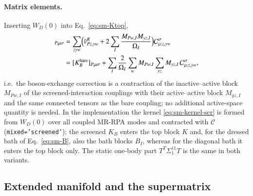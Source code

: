 \documentclass[aip,jcp,reprint,noshowkeys,superscriptaddress]{revtex4-1}
\begin{document}
\paragraph{Matrix elements.}
Inserting $W_D(0)$ into Eq.~\eqref{eq:sm-Ktop},
\begin{align}
  [K^{\rm scr}_B]_{P,\mu\sigma}
  &=\sum_{zyw}\Bigl(\bar v^R_{Pz,yw}+2\sum_I\frac{M_{Pw,I}M_{yz,I}}{\Omega_I}\Bigr)\mathcal C^{\sigma}_{\mu;z,yw}
  \nonumber\\
  &=[K^{\rm bare}_B]_{P,\mu\sigma}
  +\sum_I\frac{2}{\Omega_I}\sum_{w}M_{Pw,I}\sum_{yz}M_{yz,I}\,\mathcal C^{\sigma}_{\mu;z,yw},
  \label{eq:sm-KB-scr}
\end{align}
i.e.\ the boson-exchange correction is a contraction of the inactive--active
block $M_{Pw,I}$ of the screened-interaction couplings with their
active--active block $M_{yz,I}$ and the same connected tensors as the bare
coupling; no additional active-space quantity is needed.  In the
implementation the kernel \eqref{eq:sm-kernel-scr} is formed from $W_D(0)$
over all coupled MR-RPA modes and contracted with $\mathcal C$
(\texttt{mixed='screened'}); the screened $K_B$ enters the top block $K$
and, for the dressed bath of Eq.~\eqref{eq:sm-B}, also the bath blocks
$B_I$, whereas for the diagonal bath it enters the top block only.  The
static one-body part $T^{T}\Sigma^{11}_1T$ is the same in both variants.

\subsection{Extended manifold and the supermatrix}
\label{sec:sm-extended}
\end{document}
